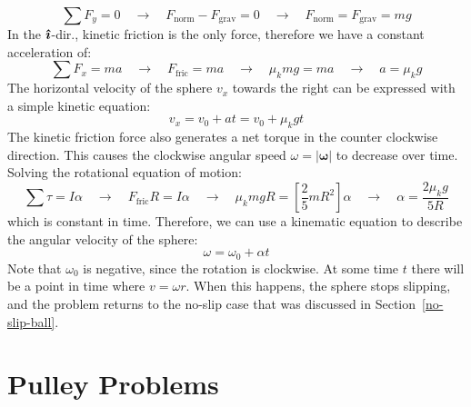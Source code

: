 \begin{equation*}
  \sum F_y = 0
  \quad\to\quad
  F_\text{norm}-F_\text{grav}=0
  \quad\to\quad
  F_\text{norm}=F_\text{grav}=mg
\end{equation*}
%
In the $\bm{\hat\imath}$-dir., kinetic friction is the only force, therefore we
have a constant acceleration of:
\begin{equation*}
  \sum F_x = ma
  \quad\to\quad
  F_\text{fric}=ma
  \quad\to\quad
  \mu_kmg=ma
  \quad\to\quad
  a=\mu_kg
\end{equation*}
The horizontal velocity of the sphere $v_x$ towards the right can be expressed
with a simple kinetic equation:
\begin{equation}
  v_x=v_0+at=v_0+\mu_kgt
\end{equation}
The kinetic friction force also generates a net torque in the counter clockwise
direction. This causes the clockwise angular speed $\omega=|\bm\omega|$ to
decrease over time. Solving the rotational equation of motion:
\begin{equation*}
  \sum\tau=I\alpha
  \quad\to\quad
  F_\text{fric}R=I\alpha
  \quad\to\quad
  \mu_kmgR=\left[\frac25mR^2\right]\alpha
  \quad\to\quad
  \alpha=\frac{2\mu_kg}{5R}
\end{equation*}
which is constant in time. Therefore, we can use a kinematic equation to
describe the angular velocity of the sphere:
\begin{equation}
  \omega=\omega_0+\alpha t
\end{equation}
Note that $\omega_0$ is negative, since the rotation is clockwise. At some time
$t$ there will be a point in time where $v=\omega r$. When this happens, the
sphere stops slipping, and the problem returns to the no-slip case that was
discussed in Section~\ref{no-slip-ball}.





\section{Pulley Problems}

